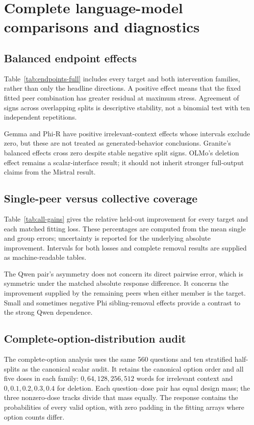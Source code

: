 \section{Complete language-model comparisons and diagnostics}
\label{app:robustness}

\subsection{Balanced endpoint effects}
Table~\ref{tab:endpoints-full} includes every target and both intervention families, rather than only the headline directions. A positive effect means that the fixed fitted peer combination has greater residual at maximum stress. Agreement of signs across overlapping splits is descriptive stability, not a binomial test with ten independent repetitions.



Gemma and Phi-R have positive irrelevant-context effects whose intervals exclude zero, but these are not treated as generated-behavior conclusions. Granite's balanced effects cross zero despite stable negative split signs. OLMo's deletion effect remains a scalar-interface result; it should not inherit stronger full-output claims from the Mistral result.

\subsection{Single-peer versus collective coverage}
Table~\ref{tab:all-gains} gives the relative held-out improvement for every target and each matched fitting loss. These percentages are computed from the mean single and group errors; uncertainty is reported for the underlying absolute improvement. Intervals for both losses and complete removal results are supplied as machine-readable tables.



The Qwen pair's asymmetry does not concern its direct pairwise error, which is symmetric under the matched absolute response difference. It concerns the improvement supplied by the remaining peers when either member is the target. Small and sometimes negative Phi sibling-removal effects provide a contrast to the strong Qwen dependence.


\subsection{Complete-option-distribution audit}
\label{app:vector}
The complete-option analysis uses the same 560 questions and ten stratified half-splits as the canonical scalar audit. It retains the canonical option order and all five doses in each family: $0,64,128,256,512$ words for irrelevant context and $0,0.1,0.2,0.3,0.4$ for deletion. Each question--dose pair has equal design mass; the three nonzero-dose tracks divide that mass equally. The response contains the probabilities of every valid option, with zero padding in the fitting arrays where option counts differ.

